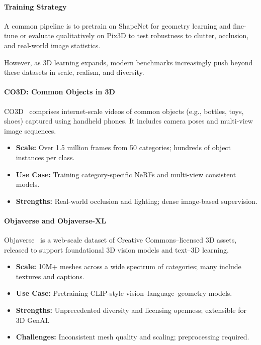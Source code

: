 \paragraph{Training Strategy}
A common pipeline is to pretrain on ShapeNet for geometry learning and fine-tune or evaluate qualitatively on Pix3D to test robustness to clutter, occlusion, and real-world image statistics.

\vspace{1em}
\noindent However, as 3D learning expands, modern benchmarks increasingly push beyond these datasets in scale, realism, and diversity.

\paragraph{CO3D: Common Objects in 3D}
CO3D~\cite{reizenstein2021_co3d} comprises internet-scale videos of common objects (e.g., bottles, toys, shoes) captured using handheld phones. It includes camera poses and multi-view image sequences.

\begin{itemize}
    \item \textbf{Scale:} Over 1.5 million frames from 50 categories; hundreds of object instances per class.
    \item \textbf{Use Case:} Training category-specific NeRFs and multi-view consistent models.
    \item \textbf{Strengths:} Real-world occlusion and lighting; dense image-based supervision.
\end{itemize}

\paragraph{Objaverse and Objaverse-XL}
Objaverse~\cite{deitke2023_objaverse} is a web-scale dataset of Creative Commons–licensed 3D assets, released to support foundational 3D vision models and text–3D learning.

\begin{itemize}
    \item \textbf{Scale:} 10M+ meshes across a wide spectrum of categories; many include textures and captions.
    \item \textbf{Use Case:} Pretraining CLIP-style vision–language–geometry models.
    \item \textbf{Strengths:} Unprecedented diversity and licensing openness; extensible for 3D GenAI.
    \item \textbf{Challenges:} Inconsistent mesh quality and scaling; preprocessing required.
\end{itemize}

